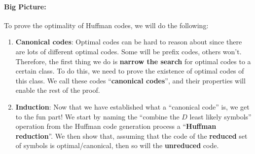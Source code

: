 \documentclass[a4paper,12pt]{report}
\begin{document}
\paragraph{Big Picture: } To prove the optimality of Huffman codes, we will do the following: 
\begin{enumerate}
\item \textbf{Canonical codes}: Optimal codes can be hard to reason about since there are lots of
different optimal codes. Some will be prefix codes, others won't. Therefore, the
first thing we do is \textbf{narrow the search} for optimal codes to a certain
class. To do this, we need to prove the existence of optimal codes of this
class. We call these codes ``\textbf{canonical codes}'', and their properties
will enable the rest of the proof.
\item \textbf{Induction}: Now that we have established what a ``canonical code''
is, we get to the fun part! We start by naming the ``combine the $D$ least
likely symbols'' operation from the Huffman code generation process a
``\textbf{Huffman reduction}''. We then show that, assuming that the code of the
\textbf{reduced} set of symbols is optimal/canonical, then so will the
\textbf{unreduced} code.
\end{enumerate}
\end{document}
